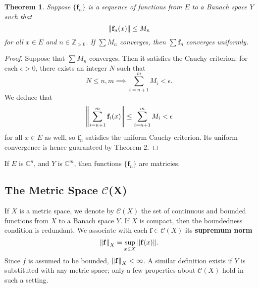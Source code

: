\documentclass[11pt]{article}
\newtheorem{theorem}{Theorem}
\renewcommand{\vec}[1]{\mathbf{#1}}
\begin{document}
\begin{theorem}
	Suppose $\{ \vec{f}_{n} \}$ is a sequence of functions from $E$ to a Banach space $Y$ such that
	\[
		\norm{\vec{f}_{n}(x)} \le M_{n}
	\]
	for all $x \in E$ and $n \in \mathbb{Z}_{> 0}$. If $\sum M_{n}$ converges, then $\sum \vec{f}_{n}$ converges uniformly.
\end{theorem}
\begin{adjustwidth}{1cm}{}
	\begin{proof}
		Suppose that $\sum M_{n}$ converges. Then it satisfies the Cauchy criterion: for each $\epsilon > 0$, there exists an integer $N$ such that
		\[
			N \le n, m \implies \sum\limits_{i = n + 1}^{m} M_{i} < \epsilon.
		\] 
		We deduce that
		\[
			\norm{\sum\limits_{i = n + 1}^{m} \vec{f}_{i}(x)} \le \sum\limits_{i = n + 1}^{m} M_{i} < \epsilon
		\]
		for all $x \in E$ as well, so $\vec{f}_{n}$ satisfies the uniform Cauchy criterion. Its uniform convergence is hence guaranteed by Theorem 2.
	\end{proof}
\end{adjustwidth}

If $E$ is $\mathbb{C}^{n}$, and $Y$ is $\mathbb{C}^{m}$, then functions $\{ \vec{f}_{n} \}$ are matricies.


\subsection{The Metric Space \texorpdfstring{$\mathcal{C}$(X)}{C(X)}}

If $X$ is a metric space, we denote by $\mathcal{C}(X)$ the set of continuous and bounded functions from $X$ to a Banach space $Y$. If $X$ is compact, then the boundedness condition is redundant. We associate with each $\vec{f} \in \mathcal{C}(X)$ its \textbf{supremum norm}
\[
	\norm{\vec{f}}_{X} = \sup\limits_{x \in X} \norm{\vec{f}(x)}.
\]
Since $f$ is assumed to be bounded, $\norm{\vec{f}}_{X} < \infty$. A similar definition exists if $Y$ is substituted with any metric space; only a few properties about $\mathcal{C}(X)$ hold in such a setting.
\end{document}
